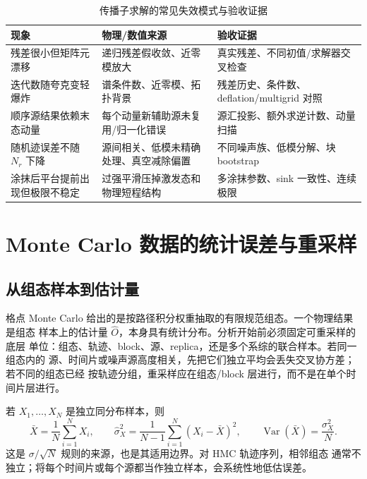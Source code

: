 \begin{table}[htbp]
\centering
\caption{传播子求解的常见失效模式与验收证据}
\label{tab:b03-solver-failures}
\begin{tabularx}{\textwidth}{@{}>{\raggedright\arraybackslash}p{}X X@{}}
\toprule
现象 & 物理/数值来源 & 验收证据 \\
\midrule
残差很小但矩阵元漂移 & 递归残差假收敛、近零模放大 & 真实残差、不同初值/求解器交叉检查 \\
迭代数随夸克变轻爆炸 & 谱条件数、近零模、拓扑背景 & 残差历史、条件数、deflation/multigrid 对照 \\
顺序源结果依赖末态动量 & 每个动量新辅助源未复用/归一化错误 & 源汇投影、额外求逆计数、动量扫描 \\
随机迹误差不随 \(N_r\) 下降 & 源间相关、低模未精确处理、真空减除偏置 & 不同噪声族、低模分解、块 bootstrap \\
涂抹后平台提前出现但极限不稳定 & 过强平滑压掉激发态和物理短程结构 & 多涂抹参数、sink 一致性、连续极限 \\
\bottomrule
\end{tabularx}
\end{table}

\chapter{Monte Carlo 数据的统计误差与重采样}
\label{sec:b03-monte-carlo-errors}

\section{从组态样本到估计量}

格点 Monte Carlo 给出的是按路径积分权重抽取的有限规范组态。一个物理结果是组态
样本上的估计量 \(\hat O\)，本身具有统计分布。分析开始前必须固定可重采样的底层
单位：组态、轨迹、block、源、replica，还是多个系综的联合样本。若同一组态内的
源、时间片或噪声源高度相关，先把它们独立平均会丢失交叉协方差；若不同的组态已经
按轨迹分组，重采样应在组态/block 层进行，而不是在单个时间片层进行。

若 \(X_1,\ldots,X_N\) 是独立同分布样本，则
\begin{equation}
  \bar X=\frac1N\sum_{i=1}^NX_i,
  \qquad
  \widehat\sigma_X^2=\frac{1}{N-1}\sum_{i=1}^N(X_i-\bar X)^2,
  \qquad
  \operatorname{Var}(\bar X)=\frac{\sigma_X^2}{N}.
  \label{eq:b03-iid-mean}
\end{equation}
这是 \(\sigma/\sqrt N\) 规则的来源，也是其适用边界。对 HMC 轨迹序列，相邻组态
通常不独立；将每个时间片或每个源都当作独立样本，会系统性地低估误差。

